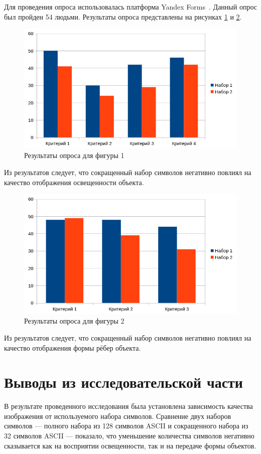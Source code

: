 Для проведения опроса использовалась платформа Yandex Forms~\cite{forms}. Данный опрос был пройден 54 людьми. Результаты опроса представлены на рисунках \ref{fig:qna1} и \ref{fig:qna2}.

\begin{figure}[H]
    \centering
    \includegraphics[scale=0.5]{images/qna1.png}
    \caption{Результаты опроса для фигуры 1}
    \label{fig:qna1}
\end{figure}

Из результатов следует, что сокращенный набор символов негативно повлиял на качество отображения освещенности объекта. 

\begin{figure}[H]
    \centering
    \includegraphics[scale=0.5]{images/qna2.png}
    \caption{Результаты опроса для фигуры 2}
    \label{fig:qna2}
\end{figure}

Из результатов следует, что сокращенный набор символов негативно повлиял на качество отображения формы рёбер объекта.

\section{Выводы из исследовательской части}

В результате проведенного исследования была установлена зависимость качества изображения от используемого набора символов. Сравнение двух наборов символов — полного набора из 128 символов ASCII и сокращенного набора из 32 символов ASCII — показало, что уменьшение количества символов негативно сказывается как на восприятии освещенности, так и на передаче формы объектов.

\clearpage
